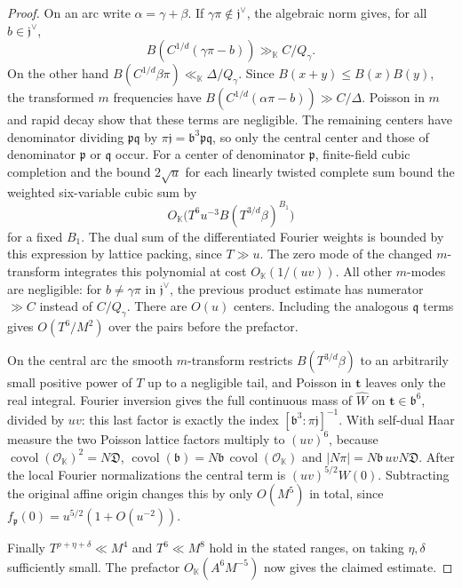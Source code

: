 \documentclass[11pt,letterpaper]{article}
\theoremstyle{definition}
\numberwithin{equation}{section}
\begin{document}
\begin{proof}
On an arc write $\alpha=\gamma+\beta$. If
$\gamma\pi\notin\mathfrak j^\vee$, the algebraic norm gives,
for all $b\in\mathfrak j^\vee$,
\[
 B(C^{1/d}(\gamma\pi-b))\gg_{\mathbb K} C/Q_\gamma.
\]
On the other hand $B(C^{1/d}\beta\pi)\ll_{\mathbb K}\Delta/Q_\gamma$.
Since $B(x+y)\le B(x)B(y)$, the transformed $m$ frequencies
have $B(C^{1/d}(\alpha\pi-b))\gg C/\Delta$. Poisson in $m$
and rapid decay show that these terms are negligible. The
remaining centers have denominator dividing
$\mathfrak p\mathfrak q$ by $\pi\mathfrak j=
\mathfrak b^3\mathfrak p\mathfrak q$, so only the central center
and those of denominator $\mathfrak p$ or $\mathfrak q$ occur.
For a center of denominator $\mathfrak p$, finite-field cubic
completion and the bound $2\sqrt u$ for each linearly twisted
complete sum bound the weighted six-variable cubic sum by
\[
 O_{\mathbb K}\big(T^6u^{-3} B(T^{3/d}\beta)^{B_1}\big)
\]
for a fixed $B_1$. The dual sum of the differentiated Fourier
weights is bounded by this expression by lattice packing,
since $T\gg u$. The zero mode of the changed $m$-transform
integrates this polynomial at cost $O_{\mathbb K}(1/(uv))$.
All other $m$-modes are negligible: for $b\ne\gamma\pi$ in
$\mathfrak j^\vee$, the previous product estimate has numerator
$\gg C$ instead of $C/Q_\gamma$. There are $O(u)$ centers.
Including the analogous $\mathfrak q$ terms gives $O(T^6/M^2)$
over the pairs before the prefactor.

On the central arc the smooth $m$-transform restricts
$B(T^{3/d}\beta)$ to an arbitrarily small positive power of $T$
up to a negligible tail, and Poisson in $\mathbf t$ leaves only
the real integral. Fourier inversion gives the full continuous
mass of $\widehat W$ on $\mathbf t\in\mathfrak b^6$, divided
by $uv$: this last factor is exactly the index
$[\mathfrak b^3:\pi\mathfrak j]^{-1}$. With self-dual Haar measure
the two Poisson lattice factors multiply to $(uv)^6$, because
$\operatorname{covol}(\mathcal O_{\mathbb K})^2=N\mathfrak D$,
$\operatorname{covol}(\mathfrak b)=N\mathfrak b\,
\operatorname{covol}(\mathcal O_{\mathbb K})$ and
$|N\pi|=N\mathfrak b\,uv N\mathfrak D$.
After the local Fourier normalizations the central term is
$(uv)^{5/2}W(0)$. Subtracting the original affine origin changes
this by only $O(M^5)$ in total, since
$f_{\mathfrak p}(0)=u^{5/2}(1+O(u^{-2}))$.

Finally $T^{\rho+\eta+\delta}\ll M^4$ and $T^6\ll M^8$
hold in the stated ranges, on taking $\eta,\delta$ sufficiently
small. The prefactor $O_{\mathbb K}(A^6 M^{-5})$ now gives the
claimed estimate.
\end{proof}
\end{document}
